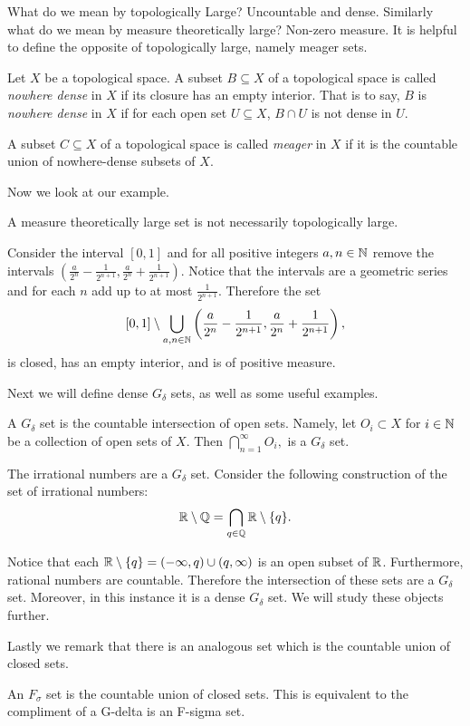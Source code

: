 
What do we mean by topologically Large? Uncountable and dense.  Similarly what do we mean by measure theoretically large?  Non-zero measure.  It is helpful to define the opposite of topologically large, namely meager sets.

\begin{definition}  Let $X$ be a topological space.  A subset $B \subseteq X$ of a topological space is called \textit{nowhere dense} in $X$ if its closure has an empty interior.  That is to say, $B$ is \textit{nowhere dense} in $X$ if for each open set $U\subseteq X$, $B\cap U$ is not dense in $U$.      
\end{definition}

\begin{definition}[Meager]  A subset $C \subseteq X$ of a topological space is called \textit{meager} in $X$ if it is the countable union of nowhere-dense subsets of $X$.    
\end{definition}
Now we look at our example.  
\begin{example}A measure theoretically large set is not necessarily topologically large.

Consider the interval $[0,1]$ and for all positive integers $a,n \in \mathbb{N}$ remove the intervals $(\frac{a}{2^n} - \frac{1}{2^{n+1}},\frac{a}{2^n} + \frac{1}{2^{n+1}})$.  Notice that the intervals are a geometric series and for each $n$ add up to at most $\frac{1}{2^{n+1}}$.  Therefore the set 
$$[0,1] \setminus \bigcup_{a,n \in \mathbb{N}} \left(\frac{a}{2^n} - \frac{1}{2^{n+1}},\frac{a}{2^n} + \frac{1}{2^{n+1}}\right),$$
is closed, has an empty interior, and is of positive measure.  
\end{example}

Next we will define dense $G_\delta$ sets, as well as some useful examples.  
\begin{definition}
    A $G_\delta$ set is the countable intersection of open sets.  Namely, let $O_i \subset X$ for $i \in \mathbb{N}$ be a collection of open sets of $X$.  Then 
    $\bigcap_{n=1}^\infty O_i,$ is a $G_\delta$ set.  
\end{definition}

\begin{example}
    The irrational numbers are a $G_\delta$ set.  Consider the following construction of the set of irrational numbers:
    $$\mathbb{R} \setminus \mathbb{Q} = \bigcap_{q \in \mathbb{Q}}\mathbb{R} \setminus \{q\}.$$
\end{example}
Notice that each $\mathbb{R}\setminus \{q\} = (-\infty, q) \cup (q, \infty)$ is an open subset of $\mathbb{R}$.  Furthermore, rational numbers are countable.  Therefore the intersection of these sets are a $G_\delta$ set.  Moreover, in this instance it is a dense $G_\delta$ set.  We will study these objects further.  

Lastly we remark that there is an analogous set which is the countable union of closed sets.
\begin{definition}
    An $F_\sigma$ set is the countable union of closed sets.  This is equivalent to the compliment of a G-delta is an F-sigma set.  
\end{definition}
